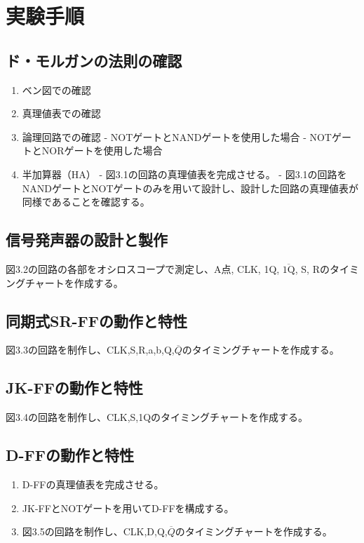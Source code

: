 \documentclass{jlreq}
\numberwithin{equation}{section}
\begin{document}
\section{実験手順}
\subsection{ド・モルガンの法則の確認}
\begin{enumerate}
  \item ベン図での確認
  \item 真理値表での確認
  \item 論理回路での確認
  - NOTゲートとNANDゲートを使用した場合
  - NOTゲートとNORゲートを使用した場合
  \item 半加算器（HA）
  - 図3.1の回路の真理値表を完成させる。
  - 図3.1の回路をNANDゲートとNOTゲートのみを用いて設計し、設計した回路の真理値表が同様であることを確認する。
\end{enumerate}

\subsection{信号発声器の設計と製作}
図3.2の回路の各部をオシロスコープで測定し、A点, CLK, 1Q, \(\overline{\text{1Q}}\), S, Rのタイミングチャートを作成する。

\subsection{同期式SR-FFの動作と特性}
図3.3の回路を制作し、CLK,S,R,a,b,Q,\(\overline{Q}\)のタイミングチャートを作成する。

\subsection{JK-FFの動作と特性}
図3.4の回路を制作し、CLK,S,1Qのタイミングチャートを作成する。

\subsection{D-FFの動作と特性}
\begin{enumerate}
  \item D-FFの真理値表を完成させる。
  \item JK-FFとNOTゲートを用いてD-FFを構成する。
  \item 図3.5の回路を制作し、CLK,D,Q,\(\overline{Q}\)のタイミングチャートを作成する。
\end{enumerate}
\end{document}
